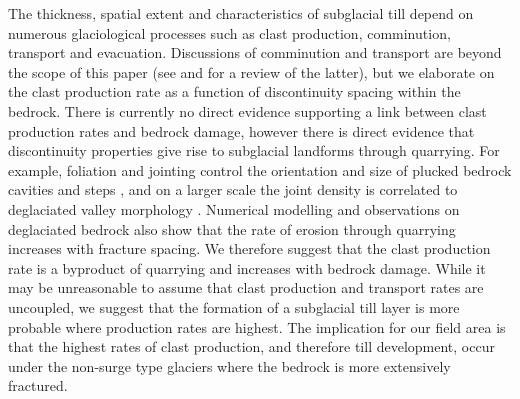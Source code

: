 \documentclass[draft,linenumbers]{agujournal}
\begin{document}
The thickness, spatial extent and characteristics of subglacial till depend on numerous glaciological processes such as clast production, comminution, transport and evacuation. Discussions of comminution and transport are beyond the scope of this paper (see \citet{Alley1997} and \citet{Hambrey1999} for a review of the latter), but we elaborate on the clast production rate as a function of discontinuity spacing within the bedrock. There is currently no direct evidence supporting a link between clast production rates and bedrock damage, however there is direct evidence that discontinuity properties give rise to subglacial landforms through quarrying. For example, foliation and jointing control the orientation and size of plucked bedrock cavities and steps \citep{Glasser1998,Krabbendam2011,Hooyer2012,Kelly2014}, and on a larger scale the joint density is correlated to deglaciated valley morphology \citep{Augustinus1995,Augustinus1992,Brook2002,Brook2004,Leith2014}. Numerical modelling \citep{Iverson2012} and observations on deglaciated bedrock \citep{Duhnforth2010} also show that the rate of erosion through quarrying increases with fracture spacing. We therefore suggest that the clast production rate is a byproduct of quarrying and increases with bedrock damage. While it may be unreasonable to assume that clast production and transport rates are uncoupled, we suggest that the formation of a subglacial till layer is more probable where production rates are highest. The implication for our field area is that the highest rates of clast production, and therefore till development, occur under the non-surge type glaciers where the bedrock is more extensively fractured. 
\end{document}
